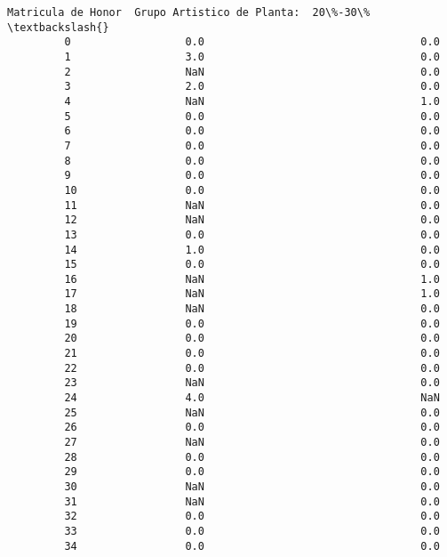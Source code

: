 \documentclass[11pt]{article}
\begin{document}
\begin{Verbatim}[commandchars=\\\{\}]
             Matricula de Honor  Grupo Artistico de Planta:  20\%-30\%  \textbackslash{}
         0                  0.0                                  0.0   
         1                  3.0                                  0.0   
         2                  NaN                                  0.0   
         3                  2.0                                  0.0   
         4                  NaN                                  1.0   
         5                  0.0                                  0.0   
         6                  0.0                                  0.0   
         7                  0.0                                  0.0   
         8                  0.0                                  0.0   
         9                  0.0                                  0.0   
         10                 0.0                                  0.0   
         11                 NaN                                  0.0   
         12                 NaN                                  0.0   
         13                 0.0                                  0.0   
         14                 1.0                                  0.0   
         15                 0.0                                  0.0   
         16                 NaN                                  1.0   
         17                 NaN                                  1.0   
         18                 NaN                                  0.0   
         19                 0.0                                  0.0   
         20                 0.0                                  0.0   
         21                 0.0                                  0.0   
         22                 0.0                                  0.0   
         23                 NaN                                  0.0   
         24                 4.0                                  NaN   
         25                 NaN                                  0.0   
         26                 0.0                                  0.0   
         27                 NaN                                  0.0   
         28                 0.0                                  0.0   
         29                 0.0                                  0.0   
         30                 NaN                                  0.0   
         31                 NaN                                  0.0   
         32                 0.0                                  0.0   
         33                 0.0                                  0.0   
         34                 0.0                                  0.0   

\end{Verbatim}
\end{document}
